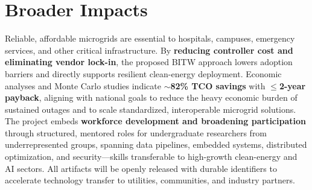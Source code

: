 \documentclass[10pt]{article}
\begin{document}
\section*{Broader Impacts}

Reliable, affordable microgrids are essential to hospitals, campuses, emergency services, and other critical infrastructure. By \textbf{reducing controller cost and eliminating vendor lock-in}, the proposed BITW approach lowers adoption barriers and directly supports resilient clean-energy deployment. Economic analyses and Monte Carlo studies indicate \textbf{$\sim$82\% TCO savings} with \textbf{$\leq$2-year payback}, aligning with national goals to reduce the heavy economic burden of sustained outages and to scale standardized, interoperable microgrid solutions. The project embeds \textbf{workforce development and broadening participation} through structured, mentored roles for undergraduate researchers from underrepresented groups, spanning data pipelines, embedded systems, distributed optimization, and security---skills transferable to high-growth clean-energy and AI sectors. All artifacts will be openly released with durable identifiers to accelerate technology transfer to utilities, communities, and industry partners.
\end{document}
